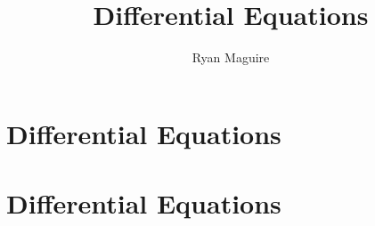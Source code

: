 \documentclass[crop=false,class=book,oneside]{standalone}
\begin{document}
\ifx\ifmath\undefined
    \title{Differential Equations}
    \author{Ryan Maguire}
    \date{\vspace{-5ex}}
    \maketitle
    \tableofcontents
    \chapter*{Differential Equations}
    \setcounter{chapter}{1}
\else
    \chapter{Differential Equations}
\fi
\end{document}
